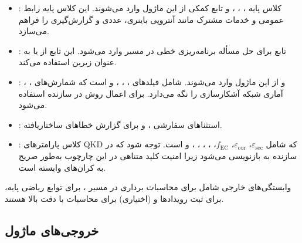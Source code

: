 \begin{itemize}
	\item {}: کلاس پایه ، ، ،  و تابع کمکی  از این ماژول وارد می‌شوند. این کلاس پایه رابط عمومی و خدمات مشترک مانند آنتروپی باینری،  عددی و گزارش‌گیری  را فراهم می‌سازد.
	\item {}: تابع  برای حل مسأله برنامه‌ریزی خطی در مسیر  وارد می‌شود. این تابع از  یا  به عنوان  زیرین استفاده می‌کند.
	\item {}: ، ،  و  از این ماژول وارد می‌شوند.  شامل فیلدهای ، ، ،  و  است که شمارش‌های آماری شبکه آشکارسازی را نگه می‌دارد.  برای اعمال روش  در سازنده استفاده می‌شود.
	\item {}: استثناهای سفارشی ،  و  برای گزارش خطاهای ساختاریافته.
	\item {}: کلاس پارامترهای QKD که شامل $\varepsilon_{\text{sec}}$، $\varepsilon_{\text{cor}}$، $f_{\text{EC}}$، ، ، ، ،  و  است. توجه شود که  در سازنده به  بازنویسی می‌شود زیرا امنیت کلید متناهی در این چارچوب به‌طور صریح به کران‌های  وابسته است.
\end{itemize}

وابستگی‌های خارجی شامل  برای محاسبات برداری در مسیر ،  برای توابع ریاضی پایه،  برای ثبت رویدادها و  (اختیاری) برای محاسبات با دقت بالا هستند.

\subsection{خروجی‌های ماژول}


